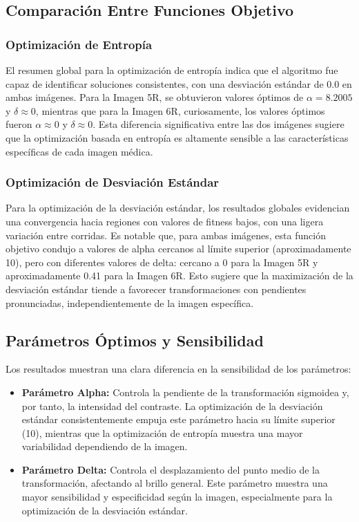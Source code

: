 \subsection{Comparación Entre Funciones Objetivo}
\subsubsection{Optimización de Entropía}
El resumen global para la optimización de entropía indica que el algoritmo fue capaz de identificar soluciones consistentes, con una desviación estándar de 0.0 en ambas imágenes. Para la Imagen 5R, se obtuvieron valores óptimos de $\alpha = 8.2005$ y $\delta \approx 0$, mientras que para la Imagen 6R, curiosamente, los valores óptimos fueron $\alpha \approx 0$ y $\delta \approx 0$. Esta diferencia significativa entre las dos imágenes sugiere que la optimización basada en entropía es altamente sensible a las características específicas de cada imagen médica.

\subsubsection{Optimización de Desviación Estándar}
Para la optimización de la desviación estándar, los resultados globales evidencian una convergencia hacia regiones con valores de fitness bajos, con una ligera variación entre corridas. Es notable que, para ambas imágenes, esta función objetivo condujo a valores de alpha cercanos al límite superior (aproximadamente 10), pero con diferentes valores de delta: cercano a 0 para la Imagen 5R y aproximadamente 0.41 para la Imagen 6R. Esto sugiere que la maximización de la desviación estándar tiende a favorecer transformaciones con pendientes pronunciadas, independientemente de la imagen específica.

\subsection{Parámetros Óptimos y Sensibilidad}
Los resultados muestran una clara diferencia en la sensibilidad de los parámetros:

\begin{itemize}
    \item \textbf{Parámetro Alpha:} Controla la pendiente de la transformación sigmoidea y, por tanto, la intensidad del contraste. La optimización de la desviación estándar consistentemente empuja este parámetro hacia su límite superior (10), mientras que la optimización de entropía muestra una mayor variabilidad dependiendo de la imagen.

    \item \textbf{Parámetro Delta:} Controla el desplazamiento del punto medio de la transformación, afectando al brillo general. Este parámetro muestra una mayor sensibilidad y especificidad según la imagen, especialmente para la optimización de la desviación estándar.
\end{itemize}

